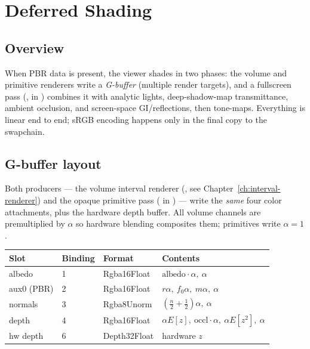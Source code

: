 \chapter{Deferred Shading}\label{ch:deferred-shading}

\section{Overview}

When PBR data is present, the viewer shades in two phases: the volume and
primitive renderers write a \emph{G-buffer} (multiple render targets), and a
fullscreen pass (,
 in )
combines it with analytic lights, deep-shadow-map transmittance, ambient
occlusion, and screen-space GI/reflections, then tone-maps. Everything is
linear  end to end; sRGB encoding happens only in the
final  copy to the swapchain.

\section{G-buffer layout}

Both producers --- the volume interval renderer
(, see Chapter~\ref{ch:interval-renderer}) and the
opaque primitive pass ( in
) --- write the \emph{same} four color attachments,
plus the hardware depth buffer. All volume channels are premultiplied by
$\alpha$ so hardware blending composites them; primitives write $\alpha = 1$.

\begin{longtable}{@{}llll@{}}
\toprule
Slot & Binding & Format & Contents \\
\midrule
albedo & 1 & Rgba16Float & $\text{albedo} \cdot \alpha,\ \alpha$ \\
aux0 (PBR) & 2 & Rgba16Float & $r\alpha,\ f_0\alpha,\ m\alpha,\ \alpha$ \\
normals & 3 & Rgba8Unorm & $(\tfrac{n}{2}{+}\tfrac12)\alpha,\ \alpha$ \\
depth & 4 & Rgba16Float & $\alpha E[z],\ \text{occl}\cdot\alpha,\ \alpha E[z^2],\ \alpha$ \\
hw depth & 6 & Depth32Float & hardware $z$ \\
\bottomrule
\end{longtable}

